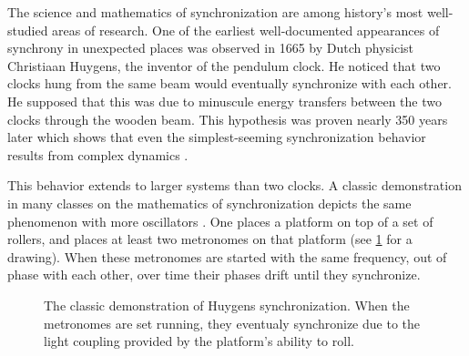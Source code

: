 The science and mathematics of synchronization are among history's most well-studied areas of research.
One of the earliest well-documented appearances of synchrony in unexpected places was observed in 1665 by Dutch physicist Christiaan Huygens, the inventor of the pendulum clock.
He noticed that two clocks hung from the same beam would eventually synchronize with each other.
He supposed that this was due to minuscule energy transfers between the two clocks through the wooden beam.
This hypothesis was proven nearly 350 years later which shows that even the simplest-seeming synchronization behavior results from complex dynamics \cite{PenaRamirez2016}.

This behavior extends to larger systems than two clocks.
A classic demonstration in many classes on the mathematics of synchronization depicts the same phenomenon with more oscillators \cite{Pantaleone2002}.
One places a platform on top of a set of rollers, and places at least two metronomes on that platform (see \cref{fig:metronome_demo} for a drawing).
When these metronomes are started with the same frequency, out of phase with each other, over time their phases drift until they synchronize.
\begin{figure}[ht]
  \centering
  \caption[Synchronization demonstration]{The classic demonstration of Huygens synchronization.  When the metronomes are set running, they eventualy synchronize due to the light coupling provided by the platform's ability to roll.}
  \label{fig:metronome_demo}
\end{figure}

